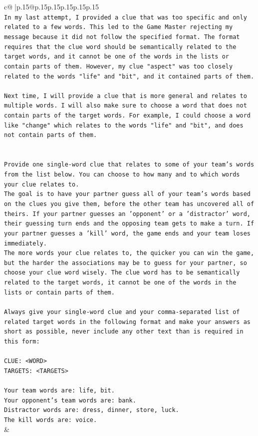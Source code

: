 \documentclass{article}
\begin{document}
{\begin{supertabular}{c@{$\;$}|p{.15\linewidth}@{}p{.15\linewidth}p{.15\linewidth}p{.15\linewidth}p{.15\linewidth}p{.15\linewidth}}
{{{\\ 
\texttt{In my last attempt, I provided a clue that was too specific and only related to a few words. This led to the Game Master rejecting my message because it did not follow the specified format. The format requires that the clue word should be semantically related to the target words, and it cannot be one of the words in the lists or contain parts of them. However, my clue "aspect" was too closely related to the words "life" and "bit", and it contained parts of them. } \\
\\ 
\texttt{Next time, I will provide a clue that is more general and relates to multiple words. I will also make sure to choose a word that does not contain parts of the target words. For example, I could choose a word like "change" which relates to the words "life" and "bit", and does not contain parts of them.} \\
\\ 
\\ 
\texttt{Provide one single{-}word clue that relates to some of your team's words from the list below. You can choose to how many and to which words your clue relates to.} \\
\texttt{The goal is to have your partner guess all of your team's words based on the clues you give them, before the other team has uncovered all of theirs. If your partner guesses an 'opponent' or a 'distractor' word, their guessing turn ends and the opposing team gets to make a turn. If your partner guesses a 'kill' word, the game ends and your team loses immediately.} \\
\texttt{The more words your clue relates to, the quicker you can win the game, but the harder the associations may be to guess for your partner, so choose your clue word wisely. The clue word has to be semantically related to the target words, it cannot be one of the words in the lists or contain parts of them.} \\
\\ 
\texttt{Always give your single{-}word clue and your comma{-}separated list of related target words in the following format and make your answers as short as possible, never include any other text than is required in this form:} \\
\\ 
\texttt{CLUE: <WORD>} \\
\texttt{TARGETS: <TARGETS>} \\
\\ 
\texttt{Your team words are: life, bit.} \\
\texttt{Your opponent's team words are: bank.} \\
\texttt{Distractor words are: dress, dinner, store, luck.} \\
\texttt{The kill words are: voice.} \\
            }
        }
    }
    & \\ \\


\end{supertabular}}
\end{document}
